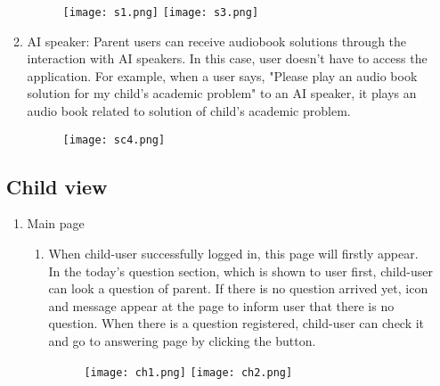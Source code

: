 \documentclass[conference]{IEEEtran}
\begin{document}
\begin{enumerate}
\begin{enumerate}
                  \begin{figure}[H]
                 \centering
                 \texttt{[image: s1.png]}
                 \texttt{[image: s3.png]}
                 \end{figure}
                \item AI speaker: Parent users can receive audiobook solutions through the interaction with AI speakers. In this case, user doesn't have to access the application. For example, when a user says, "Please play an audio book solution for my child's academic problem" to an AI speaker, it plays an audio book related to solution of child's academic problem.
                 \begin{figure}[H]
                 \centering
                 \texttt{[image: sc4.png]}
                 \end{figure}
            \end{enumerate}
\newpage
        \subsection{Child view}
        \begin{enumerate}
            \item Main page
            
            \begin{enumerate}
                \item When child-user successfully logged in, this page will firstly appear. In the today’s question section, which is shown to user first, child-user can look a question of parent. If there is no question arrived yet, icon and message appear at the page to inform user that there is no question. When there is a question registered, child-user can check it and go to answering page by clicking the button.
                \begin{figure}[H]
                 \centering
                 \texttt{[image: ch1.png]}
                 \texttt{[image: ch2.png]}
                 \end{figure}
                 

\end{enumerate}
\end{enumerate}
\end{enumerate}
\end{document}
